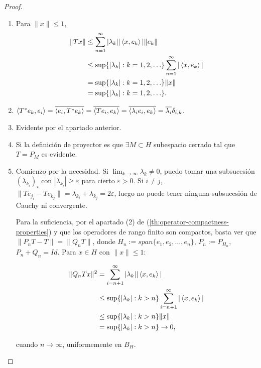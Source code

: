 \begin{proof}\hfill
  \begin{enumerate}
    \item Para $\|x\|\le 1$, 
      \begin{align*}
        \|Tx\| & \le \sum_{n=1}^{\infty} |\lambda_k| |\left\langle x,e_k\right\rangle| \|e_k\| \\
               & \le \sup \{|\lambda_k|:k=1,2,\ldots\} \sum_{n=1}^{\infty} |\left\langle x,e_k\right\rangle| \\
               & = \sup \{|\lambda_k|:k=1,2,\ldots\} \|x\| \\
               & = \sup \{|\lambda_k|:k=1,2,\ldots\}
      .\end{align*}
    \item $\left\langle T^*e_k,e_i\right\rangle= \overline{\left\langle e_i,T^*e_k\right\rangle}=
      \overline{\left\langle Te_i,e_k\right\rangle}= \overline{\left\langle\lambda_i
      e_i,e_k\right\rangle}=\overline{\lambda_i} \delta_{i,k}$.

    \item Evidente por el apartado anterior.
    \item Si la definición de proyector es que $\exists M\subset H$ subespacio
      cerrado tal que $T=P_M$ es evidente.
    \item Comienzo por la necesidad. Si $\lim_{k \to \infty} \lambda_k \neq 0$,
      puedo tomar una subsucesión $(\lambda_{k_i})_i$ con $|\lambda_{k_i}|\ge
      \varepsilon$ para cierto $\varepsilon>0$. Si $i\neq j$,
      $\|Te_{j_i}-Te_{k_j}\|=\lambda_{k_i}+\lambda_{k_j}=2\varepsilon$, luego no
      puede tener ninguna subsucesión de Cauchy ni convergente.

      Para la suficiencia, por el apartado (2) de
      (\ref{th:operator-compactness-properties}) y que los operadores de rango
      finito son compactos, basta ver que $\|P_nT-T\|=\|Q_nT\|$, donde
      $H_n:=span \{e_1,e_2,\ldots,e_n\}$, $P_n:=P_{H_n}$, $P_n+Q_n=Id$. Para
      $x\in H$ con $\|x\|\le 1$:

      \begin{align*}
        \|Q_nTx\|^2 & =\sum_{i=n+1}^{\infty} |\lambda_k| |\left\langle x,e_k\right\rangle|\\
                    & \le \sup \{|\lambda_k|: k>n\}\sum_{i=n+1}^{\infty} |\left\langle x,e_k\right\rangle|\\
                    & \le \sup \{|\lambda_k|: k>n\}\|x\|\\
                    & = \sup \{|\lambda_k|: k>n\} \to 0
      ,\end{align*}

      cuando $n\to \infty$, uniformemente en $B_H$.
  \end{enumerate}
\end{proof}


